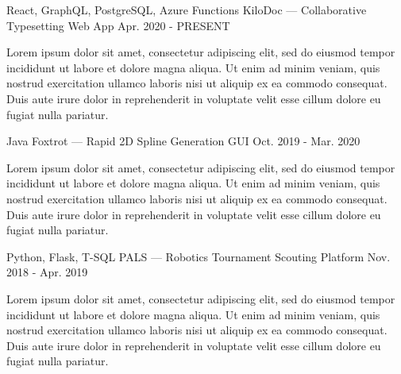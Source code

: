 
\begin{cventries}
  \cventry
  {React, GraphQL, PostgreSQL, Azure Functions} %
  {KiloDoc --- Collaborative Typesetting Web App} %
  {} %
  {Apr. 2020 - PRESENT} %
  {
    \begin{cvitems} %
      \item {Lorem ipsum dolor sit amet, consectetur adipiscing elit, sed do eiusmod tempor incididunt ut labore et dolore magna aliqua. Ut enim ad minim veniam, quis nostrud exercitation ullamco laboris nisi ut aliquip ex ea commodo consequat. Duis aute irure dolor in reprehenderit in voluptate velit esse cillum dolore eu fugiat nulla pariatur.}
    \end{cvitems}
  }

  \cventry
  {Java} %
  {Foxtrot --- Rapid 2D Spline Generation GUI} %
  {} %
  {Oct. 2019 - Mar. 2020} %
  {
    \begin{cvitems} %
      \item {Lorem ipsum dolor sit amet, consectetur adipiscing elit, sed do eiusmod tempor incididunt ut labore et dolore magna aliqua. Ut enim ad minim veniam, quis nostrud exercitation ullamco laboris nisi ut aliquip ex ea commodo consequat. Duis aute irure dolor in reprehenderit in voluptate velit esse cillum dolore eu fugiat nulla pariatur.}
    \end{cvitems}
  }

  \cventry
  {Python, Flask, T-SQL} %
  {PALS --- Robotics Tournament Scouting Platform} %
  {} %
  {Nov. 2018 - Apr. 2019} %
  {
    \begin{cvitems} %
      \item {Lorem ipsum dolor sit amet, consectetur adipiscing elit, sed do eiusmod tempor incididunt ut labore et dolore magna aliqua. Ut enim ad minim veniam, quis nostrud exercitation ullamco laboris nisi ut aliquip ex ea commodo consequat. Duis aute irure dolor in reprehenderit in voluptate velit esse cillum dolore eu fugiat nulla pariatur.}
    \end{cvitems}
  }
\end{cventries}
